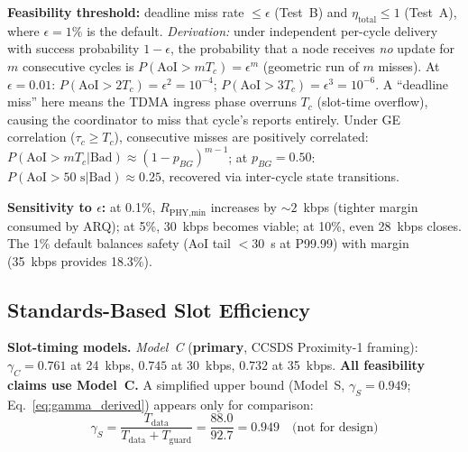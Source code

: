 \documentclass[journal]{IEEEtran}
\begin{document}
\textbf{Feasibility threshold:} deadline miss rate $\leq \epsilon$ (Test~B) and $\eta_{\text{total}} \leq 1$ (Test~A), where $\epsilon = 1\%$ is the default. \emph{Derivation:} under independent per-cycle delivery with success probability $1 - \epsilon$, the probability that a node receives \emph{no} update for $m$ consecutive cycles is $P(\text{AoI} > m T_c) = \epsilon^m$ (geometric run of $m$ misses). At $\epsilon = 0.01$: $P(\text{AoI} > 2T_c) = \epsilon^2 = 10^{-4}$; $P(\text{AoI} > 3T_c) = \epsilon^3 = 10^{-6}$. A ``deadline miss'' here means the TDMA ingress phase overruns $T_c$ (slot-time overflow), causing the coordinator to miss that cycle's reports entirely. Under GE correlation ($\tau_c \geq T_c$), consecutive misses are positively correlated: $P(\text{AoI} > m T_c | \text{Bad}) \approx (1 - p_{BG})^{m-1}$; at $p_{BG} = 0.50$: $P(\text{AoI} > 50\text{~s}|\text{Bad}) \approx 0.25$, recovered via inter-cycle state transitions.

\textbf{Sensitivity to $\epsilon$:} at 0.1\%, $R_{\text{PHY,min}}$ increases by ${\sim}2$~kbps (tighter margin consumed by ARQ); at 5\%, 30~kbps becomes viable; at 10\%, even 28~kbps closes. The 1\% default balances safety (AoI tail $< 30$~s at P99.99) with margin (35~kbps provides 18.3\%).

\subsection{Standards-Based Slot Efficiency}
\label{sec:packet_derivation}

\textbf{Slot-timing models.} \emph{Model~C} (\textbf{primary}, CCSDS Proximity-1 framing): $\gamma_C = 0.761$ at 24~kbps, $0.745$ at 30~kbps, $0.732$ at 35~kbps. \textbf{All feasibility claims use Model~C.} A simplified upper bound (Model~S, $\gamma_S = 0.949$; Eq.~\ref{eq:gamma_derived}) appears only for comparison:
\begin{equation}
    \gamma_S = \frac{T_{\text{data}}}{T_{\text{data}} + T_{\text{guard}}} = \frac{88.0}{92.7} = 0.949 \quad \text{(not for design)}
    \label{eq:gamma_derived}
\end{equation}
\end{document}
